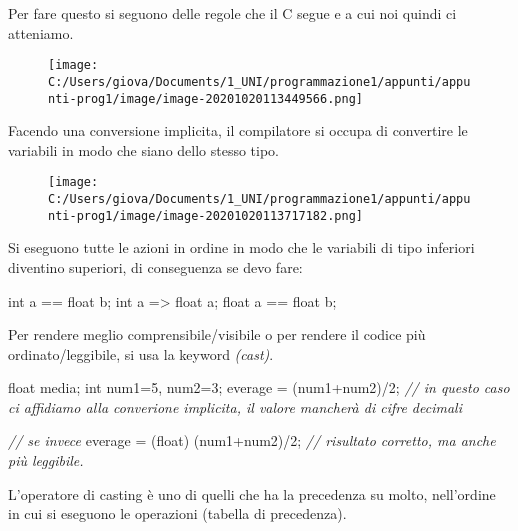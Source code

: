 \documentclass[
]{article}
\newenvironment{Shaded}{}{}
\newcommand{\CommentTok}[1]{\textcolor[rgb]{0.38,0.63,0.69}{\textit{#1}}}
\newcommand{\DataTypeTok}[1]{\textcolor[rgb]{0.56,0.13,0.00}{#1}}
\newcommand{\DecValTok}[1]{\textcolor[rgb]{0.25,0.63,0.44}{#1}}
\newcommand{\NormalTok}[1]{#1}
\begin{document}
Per fare questo si seguono delle regole che il C segue e a cui noi
quindi ci atteniamo.

\begin{figure}
\centering
\texttt{[image: C:/Users/giova/Documents/1\_UNI/programmazione1/appunti/appunti-prog1/image/image-20201020113449566.png]}
\caption{}
\end{figure}

Facendo una conversione implicita, il compilatore si occupa di
convertire le variabili in modo che siano dello stesso tipo.

\begin{figure}
\centering
\texttt{[image: C:/Users/giova/Documents/1\_UNI/programmazione1/appunti/appunti-prog1/image/image-20201020113717182.png]}
\caption{}
\end{figure}

Si eseguono tutte le azioni in ordine in modo che le variabili di tipo
inferiori diventino superiori, di conseguenza se devo fare:

\begin{Shaded}
\begin{Highlighting}[]
\DataTypeTok{int}\NormalTok{ a == }\DataTypeTok{float}\NormalTok{ b; }
	\DataTypeTok{int}\NormalTok{ a =\textgreater{} }\DataTypeTok{float}\NormalTok{ a;}
	\DataTypeTok{float}\NormalTok{ a == }\DataTypeTok{float}\NormalTok{ b;}
\end{Highlighting}
\end{Shaded}

Per rendere meglio comprensibile/visibile o per rendere il codice più
ordinato/leggibile, si usa la keyword \emph{(cast)}.

\begin{Shaded}
\begin{Highlighting}[]
\DataTypeTok{float}\NormalTok{ media;}
\DataTypeTok{int}\NormalTok{ num1=}\DecValTok{5}\NormalTok{, num2=}\DecValTok{3}\NormalTok{;}
\NormalTok{everage = (num1+num2)/}\DecValTok{2}\NormalTok{; }\CommentTok{// in questo caso ci affidiamo alla converione implicita, il valore mancherà di cifre decimali}

\CommentTok{// se invece }
\NormalTok{everage = (}\DataTypeTok{float}\NormalTok{) (num1+num2)/}\DecValTok{2}\NormalTok{; }\CommentTok{// risultato corretto, ma anche più leggibile.}
\end{Highlighting}
\end{Shaded}

L'operatore di casting è uno di quelli che ha la precedenza su molto,
nell'ordine in cui si eseguono le operazioni (tabella di precedenza).
\end{document}
